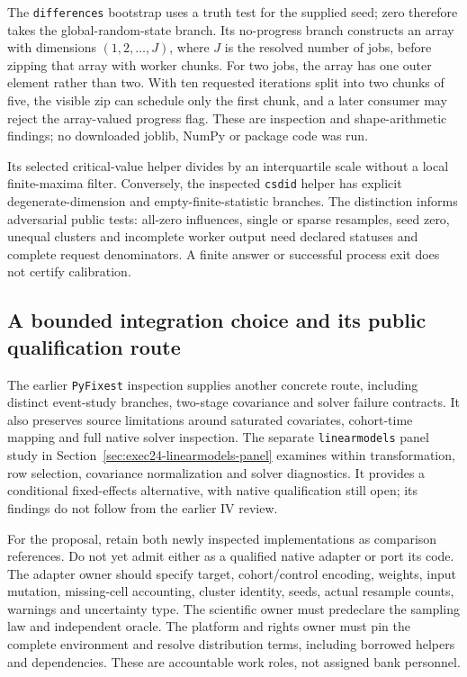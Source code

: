 The \texttt{differences} bootstrap uses a truth test for the supplied seed;
zero therefore takes the global-random-state branch. Its no-progress branch
constructs an array with dimensions $(1,2,\ldots,J)$, where $J$ is the
resolved number of jobs, before zipping that array with worker chunks.
For two jobs, the array has one outer element rather than two. With ten
requested iterations split into two chunks of five, the visible zip can
schedule only the first chunk, and a later consumer may reject the
array-valued progress flag. These are inspection and shape-arithmetic
findings; no downloaded joblib, NumPy or package code was run.
\citep{exec24_panelpy_differences,exec24_panelpy_contract}

Its selected critical-value helper divides by an interquartile scale without
a local finite-maxima filter. Conversely, the inspected \texttt{csdid}
helper has explicit degenerate-dimension and empty-finite-statistic branches.
The distinction informs adversarial public tests: all-zero influences,
single or sparse resamples, seed zero, unequal clusters and incomplete
worker output need declared statuses and complete request denominators.
A finite answer or successful process exit does not certify calibration.
\citep{exec24_panelpy_differences,exec24_panelpy_csdid}

\subsection{A bounded integration choice and its public qualification route}
The earlier \texttt{PyFixest} inspection supplies another concrete route,
including distinct event-study branches, two-stage covariance and solver
failure contracts. It also preserves source limitations around saturated
covariates, cohort-time mapping and full native solver inspection.
The separate \texttt{linearmodels} panel study in
Section~\ref{sec:exec24-linearmodels-panel} examines within transformation,
row selection, covariance normalization and solver diagnostics. It provides
a conditional fixed-effects alternative, with native qualification still open;
its findings do not follow from the earlier IV review.
\citep{exec23_pyfixest_reuse_source,exec22_linearmodels_reuse}

For the proposal, retain both newly inspected implementations as comparison
references. Do not yet admit either as a qualified native adapter or port its
code. The adapter owner should specify target, cohort/control encoding,
weights, input mutation, missing-cell accounting, cluster identity, seeds,
actual resample counts, warnings and uncertainty type. The scientific owner
must predeclare the sampling law and independent oracle. The platform and
rights owner must pin the complete environment and resolve distribution
terms, including borrowed helpers and dependencies. These are accountable
work roles, not assigned bank personnel.
\citep{exec24_panelpy_contract,exec24_panelpy_differences,exec24_panelpy_csdid}

